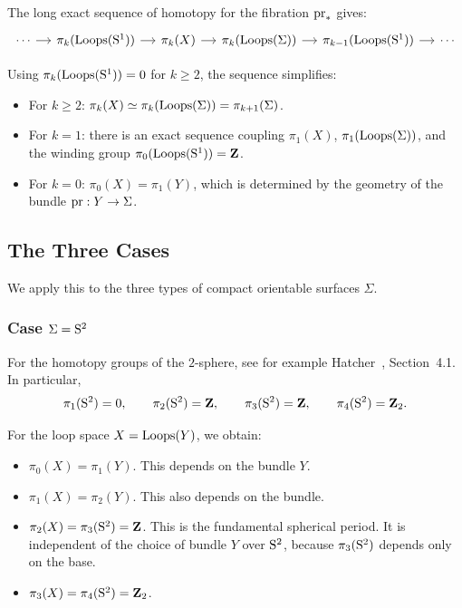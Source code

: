 \documentclass[11pt,reqno,letterpaper,twoside]{amsart}
\begin{document}
  The long exact sequence of homotopy for the fibration $\pr_*$ gives:
  \[
    \begin{tikzcd}[column sep=small]
    \cdots \arrow[r] & \pi_k(\Loops(\Sph^1)) \arrow[r] & \pi_k(X) \arrow[r] & \pi_k(\Loops(\Sigma)) \arrow[r] & \pi_{k-1}(\Loops(\Sph^1)) \arrow[r] & \cdots
    \end{tikzcd}
    \]
  
  Using $\pi_k(\operatorname{Loops}(\mathrm{S}^1)) = 0$ for $k \geq 2$,
  the sequence simplifies:
  \begin{itemize}[nosep]
    \item[--] For $k \geq 2$:
    $\pi_k(X) \simeq \pi_k(\operatorname{Loops}(\Sigma)) = \pi_{k+1}(\Sigma)$.
    \item[--] For $k = 1$:
    there is an exact sequence coupling $\pi_1(X)$,
    $\pi_1(\operatorname{Loops}(\Sigma))$,
    and the winding group $\pi_0(\operatorname{Loops}(\mathrm{S}^1)) = {\mathbf{Z}}$.
    \item[--] For $k = 0$:
    $\pi_0(X) = \pi_1(Y)$,
    which is determined by the geometry of the bundle $\pr: Y \to \Sigma$.
  \end{itemize}
  
  \subsection{The Three Cases}
  
  We apply this to the three types of compact orientable surfaces $\Sigma$.
  
  \subsubsection{Case $\Sigma = \mathrm{S}^2$}
  
  For the homotopy groups of the $2$-sphere,
  see for example Hatcher~\cite{Hat02},
  Section~4.1.
  In particular,
  \[
    \pi_1(\mathrm{S}^2) = 0,
    \qquad
    \pi_2(\mathrm{S}^2) = {\mathbf{Z}},
    \qquad
    \pi_3(\mathrm{S}^2) = {\mathbf{Z}},
    \qquad
    \pi_4(\mathrm{S}^2) = {\mathbf{Z}}_2.
    \]
  
  For the loop space $X = \operatorname{Loops}(Y)$, we obtain:
  \begin{itemize}[nosep]
    \item[--] $\pi_0(X) = \pi_1(Y)$.
    This depends on the bundle $Y$.
    \item[--] $\pi_1(X) = \pi_2(Y)$.
    This also depends on the bundle.
    \item[--] $\pi_2(X) = \pi_3(\mathrm{S}^2) = {\mathbf{Z}}$.
    This is the fundamental spherical period.
    It is independent of the choice of bundle $Y$ over $\mathrm{S}^2$,
    because $\pi_3(\mathrm{S}^2)$ depends only on the base.
    \item[--] $\pi_3(X) = \pi_4(\mathrm{S}^2) = {\mathbf{Z}}_2$.
  \end{itemize}
  
\end{document}
